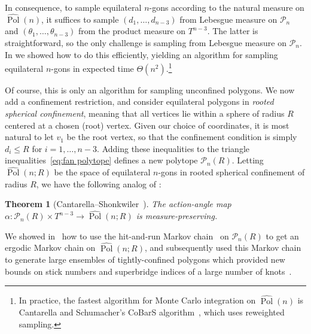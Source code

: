 \documentclass{article}
\newtheorem{theorem}{Theorem}
\theoremstyle{definition}
\newcommand{\Polhat}{\widehat{\operatorname{Pol}}}
\begin{document}
In consequence, to sample equilateral $n$-gons according to the natural measure on $\Polhat(n)$, it suffices to sample $(d_1, \dots , d_{n-3})$ from Lebesgue measure on $\mathcal{P}_n$ and $(\theta_1,\dots , \theta_{n-3})$ from the product measure on $T^{n-3}$. The latter is straightforward, so the only challenge is sampling from Lebesgue measure on $\mathcal{P}_n$. In \cite{cantarellaFasterDirectSampling2024,cantarellaFastDirectSampling2016} we showed how to do this efficiently, yielding an algorithm for sampling equilateral $n$-gons in expected time $\Theta(n^2)$.\footnote{In practice, the fastest algorithm for Monte Carlo integration on $\Polhat(n)$ is Cantarella and Schumacher's CoBarS algorithm~\cite{cantarellaCoBarSFastReweighted2024,cantarellaComputingConformalBarycenter2022}, which uses reweighted sampling.}

Of course, this is only an algorithm for sampling unconfined polygons. We now add a confinement restriction, and consider equilateral polygons in \emph{rooted spherical confinement}, meaning that all vertices lie within a sphere of radius $R$ centered at a chosen (root) vertex. Given our choice of coordinates, it is most natural to let $v_1$ be the root vertex, so that the confinement condition is simply $d_i \leq R$ for $i=1, \dots , n-3$. Adding these inequalities to the triangle inequalities~\eqref{eq:fan polytope} defines a new polytope $\mathcal{P}_n(R)$. Letting $\Polhat(n;R)$ be the space of equilateral $n$-gons in rooted spherical confinement of radius $R$, we have the following analog of :

\begin{theorem}[{Cantarella--Shonkwiler~\cite{cantarellaSymplecticGeometryClosed2016}}]\label{thm:confined measure equivalence}
	The action-angle map $\alpha: \mathcal{P}_n(R) \times T^{n-3} \to \Polhat(n;R)$ is measure-preserving.
\end{theorem}

We showed in~\cite{cantarellaSymplecticGeometryClosed2016} how to use the hit-and-run Markov chain~\cite{bonehConstraintsRedundancyFeasible1979,smithEfficientMonteCarlo1984,andersenHitRunUnifying2007} on $\mathcal{P}_n(R)$ to get an ergodic Markov chain on $\Polhat(n;R)$, and subsequently used this Markov chain to generate large ensembles of tightly-confined polygons which provided new bounds on stick numbers and superbridge indices of a large number of knots~\cite{eddyImprovedStickNumber2019,eddyNewStickNumber2022,blairKnotsExactly102020,shonkwilerNewComputationsSuperbridge2020,shonkwilerAllPrimeKnots2022,shonkwilerNewSuperbridgeIndex2022a}. 
\end{document}
